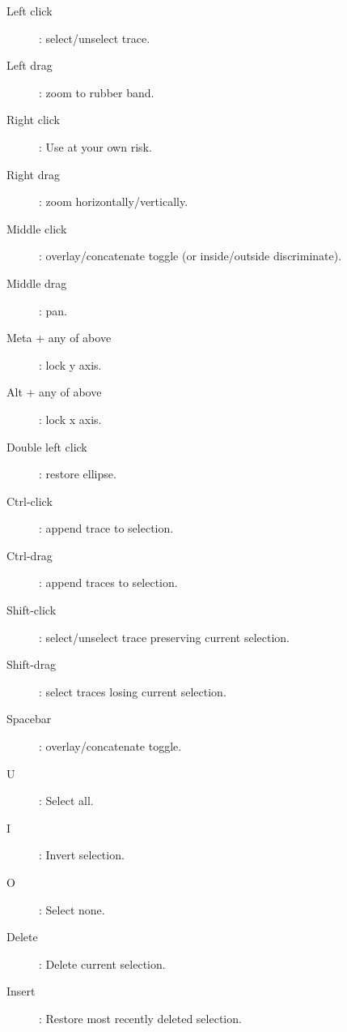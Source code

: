 \documentclass{article}
\begin{document}
	\begin{description}
		\item[Left click]: select/unselect trace.
		\item[Left drag]: zoom to rubber band.
	  \item[Right click]: Use at your own risk.
	  \item[Right drag]: zoom horizontally/vertically.
		\item[Middle click]: overlay/concatenate toggle (or inside/outside discriminate).
		\item[Middle drag]: pan.
		\item[Meta + any of above]: lock y axis.
		\item[Alt + any of above]: lock x axis.
		\item[Double left click]: restore ellipse.
		\item[Ctrl-click]: append trace to selection.
		\item[Ctrl-drag]: append traces to selection.
		\item[Shift-click]: select/unselect trace preserving current selection.
		\item[Shift-drag]: select traces losing current selection.
		\item[Spacebar]: overlay/concatenate toggle.
		\item[U]: Select all.
		\item[I]: Invert selection.
		\item[O]: Select none.
		\item[Delete]: Delete current selection.
		\item[Insert]: Restore most recently deleted selection.
	\end{description}
\end{document}
